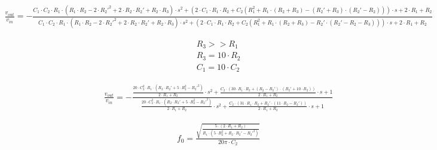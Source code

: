 \begin{ssmall}
\begin{adjustwidth*}{-1.3cm}{}
    \begin{align}
        &\frac{v_{out}}{v_{in}} = - \frac{C_1 \cdot C_2 \cdot R_1 \cdot \left(R_1 \cdot R_2 - 2 \cdot R_2'^2 + 2 \cdot R_2 \cdot R_2' + R_2 \cdot R_3\right) \cdot s^2 +
                                        \left(2 \cdot C_1 \cdot R_1 \cdot R_2 + C_2 \left(R_1^2 + R_1 \cdot \left(R_2 + R_3\right) - \left(R_2' + R_3\right) \cdot \left(R_2' - R_2\right)\right)\right) \cdot s +
                                        2 \cdot R_1 + R_2}
                                        {C_1 \cdot C_2 \cdot R_1 \cdot \left(R_1 \cdot R_2 - 2 \cdot R_2'^2 + 2 \cdot R_2 \cdot R_2' + R_2 \cdot R_3\right) \cdot s^2 +
                                        \left(2 \cdot C_1 \cdot R_1 \cdot R_2 + C_2 \left(R_1^2 + R_1 \cdot \left(R_2 + R_3\right) - R_2' \cdot \left(R_2' - R_2 - R_3\right)\right)\right) \cdot s +
                                        2 \cdot R_1 + R_2} \label{eq:ej5_complete_transference}
    \end{align}
\end{adjustwidth*}
\end{ssmall}

\begin{align}
    &R_3 >> R_1 \\
    &R_3 = 10 \cdot R_2 \\
    &C_1 = 10 \cdot C_2
\end{align}

\begin{align}
    &\frac{v_{out}}{v_{in}} = - \frac{\frac{20 \cdot C_2^2 \cdot R_1 \cdot \left(R_2 \cdot R_2' + 5 \cdot R_2^2 - R_2'^2\right)}{2 \cdot R_1 + R_2} \cdot s^2 +
                                        \frac{C_2 \cdot \left(30 \cdot R_1 \cdot R_2 + \left(R_2 - R_2'\right) \cdot \left(R_2' + 10 \cdot R_2\right)\right)}{2 \cdot R_1 + R_2} \cdot s +
                                        1}
                                        {\frac{20 \cdot C_2^2 \cdot R_1 \cdot \left(R_2 \cdot R_2' + 5 \cdot R_2^2 - R_2'^2\right)}{2 \cdot R_1 + R_2} \cdot s^2 +
                                        \frac{C_2 \cdot \left(31 \cdot R_1 \cdot R_2 + R_2' \cdot \left(11 \cdot R_2 - R_2'\right)\right)}{2 \cdot R_1 + R_2} \cdot s +
                                        1} \label{eq:ej5_approx_transference}
\end{align}

\begin{align}
    &f_0 = \frac{\sqrt{\frac{5 \cdot \left(2 \cdot R_1 + R_2\right)}{R_1 \cdot \left(5 \cdot R_2^2 + R_2 \cdot R_2' - R_2'^2\right)}}}{20 \pi \cdot C_2}
    \label{eq:ej5_notch_frequency}
\end{align}


